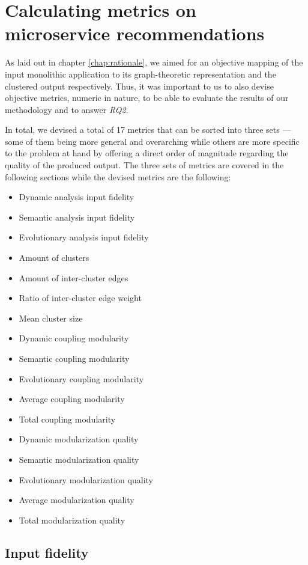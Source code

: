 \documentclass[12pt,a4paper]{report}
\begin{document}
\chapter{Calculating metrics on microservice recommendations} \label{chap:metrics}

As laid out in chapter \ref{chap:rationale}, we aimed for an objective
mapping of the input monolithic application to its graph-theoretic representation
and the clustered output respectively.
Thus, it was important to us to also devise objective metrics, numeric in nature,
to be able to evaluate the results of our methodology and to answer \textit{RQ2}.

In total, we devised a total of 17 metrics that can be sorted into three sets ---
some of them being more general and overarching while others are more specific
to the problem at hand by offering a direct order of magnitude regarding the
quality of the produced output. The three sets of metrics are covered
in the following sections while the devised metrics are the following:
\begin{itemize}
  \item Dynamic analysis input fidelity
  \item Semantic analysis input fidelity
  \item Evolutionary analysis input fidelity
  \item Amount of clusters
  \item Amount of inter-cluster edges
  \item Ratio of inter-cluster edge weight
  \item Mean cluster size
  \item Dynamic coupling modularity
  \item Semantic coupling modularity
  \item Evolutionary coupling modularity
  \item Average coupling modularity
  \item Total coupling modularity
  \item Dynamic modularization quality
  \item Semantic modularization quality
  \item Evolutionary modularization quality
  \item Average modularization quality
  \item Total modularization quality
\end{itemize}



\section{Input fidelity} \label{sect:input-fidelity-metrics}
\end{document}
